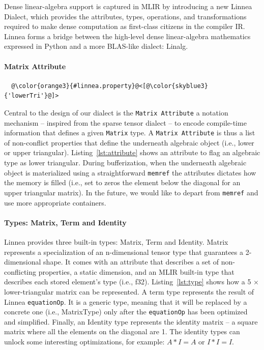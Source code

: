\documentclass[conference]{IEEEtran}
\begin{document}
Dense linear-algebra support is captured in MLIR by introducing a new Linnea
Dialect, which provides the attributes, types, operations, and transformations
required to make dense computation as first-class citizens in the compiler IR.
Linnea forms a bridge between the high-level dense linear-algebra mathematics
expressed in Python and a more BLAS-like dialect: Linalg.

\paragraph{Matrix Attribute}

\begin{listing}[]
\begin{center}
\begin{minipage}[]{0.5\textwidth}
\begin{verbatim}
  @\color{orange3}{#linnea.property}@<[@\color{skyblue3}{'lowerTri'}@]>
\end{verbatim}
\end{minipage}
\caption{Linnea attributes attach properties to the underneath algebraic object.}
\label{lst:attribute}
\end{center}
\end{listing}

Central to the design of our dialect is the \texttt{Matrix Attribute} a
notation mechanism -- inspired from the sparse tensor dialect -- to encode
compile-time information that defines a given \texttt{Matrix} type. A
\texttt{Matrix Attribute} is thus a list of non-conflict properties that define
the underneath algebraic object (i.e., lower or upper triangular).
Listing~\ref{lst:attribute} shows an attribute to flag an algebraic type as
lower triangular. During bufferization, when the underneath algebraic object is
materialized using a straightforward \texttt{memref} the attributes dictates
how the memory is filled (i.e., set to zeros the element below the diagonal for
an upper triangular matrix). In the future, we would like to depart from
\texttt{memref} and use more appropriate containers.

\paragraph{Types: Matrix, Term and Identity}

Linnea provides three built-in types: Matrix, Term and Identity. Matrix
represents a specialization of an n-dimensional tensor type that guarantees a
2-dimensional shape. It comes with an attribute that describes a set of
non-conflicting properties, a static dimension, and an MLIR built-in type that
describes each stored element's type (i.e., f32). Listing~\ref{lst:type} shows
how a 5 $\times$ lower-triangular matrix can be represented. A term type
represents the result of Linnea \texttt{equationOp}. It is a generic type,
meaning that it will be replaced by a concrete one (i.e., MatrixType) only
after the \texttt{equationOp} has been optimized and simplified. Finally, an
Identity type represents the identity matrix -- a square matrix where all the
elements on the diagonal are 1. The identity types can unlock some interesting
optimizations, for example: $A * I = A$ or $I * I = I$.
\end{document}
